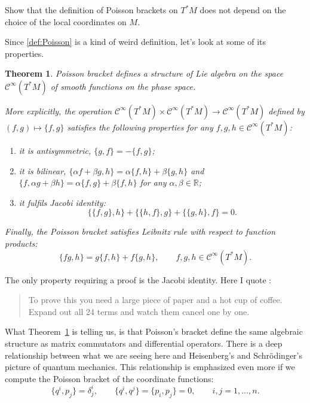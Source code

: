 \documentclass[english,fontsize=11pt,paper=a5,oneside]{scrbook}
\newcommand{\cC}{\mathcal{C}}
\newcommand{\R}{\mathbb{R}}
\newtheorem{theorem}{Theorem}[chapter]
\theoremstyle{definition}
\newenvironment{exercise}
  {\pushQED{\qed}\renewcommand{\qedsymbol}{$\maltese$}\exercisex}
  {\popQED\endexercisex}
\begin{document}
\begin{exercise}
    Show that the definition of Poisson brackets on $T^*M$ does not depend on the choice of the local coordinates on $M$.
\end{exercise}

Since \ref{def:Poisson} is a kind of weird definition, let’s look at some of its properties.

\begin{theorem}\label{thm:PoissonLieAlgebra}
    Poisson bracket defines a structure of Lie algebra on the space $\cC^\infty(T^*M)$ of smooth functions on the phase space.

    More explicitly, the operation $\cC^\infty(T^*M)\times \cC^\infty(T^*M) \to \cC^\infty(T^*M)$ defined by $(f,g) \mapsto \big\{f,g\big\}$ satisfies the following properties for any $f,g,h \in \cC^\infty(T^*M)$:
    \begin{enumerate}
        \item it is antisymmetric, $\big\{g,f\big\} = - \big\{f,g\big\}$;
        \item it is bilinear, $\big\{\alpha f + \beta g, h\big\} = \alpha\big\{f,h\big\} + \beta\big\{g,h\big\}$ and $\big\{f, \alpha g + \beta h\big\} = \alpha\big\{f,g\big\} + \beta\big\{f,h\big\}$ for any $\alpha, \beta \in\R$;
        \item it fulfils \emph{Jacobi identity}: 
        \begin{equation}\label{eq:JacobiId}
            \big\{\big\{f,g\big\},h\big\} + \big\{\big\{h,f\big\},g\big\} + \big\{\big\{g,h\big\},f\big\} = 0.
        \end{equation}
    \end{enumerate}
    Finally, the Poisson bracket satisfies \emph{Leibnitz rule} with respect to function products:
    \begin{equation}\label{eq:LeibnitzId}
        \big\{fg, h\big\} = g\big\{f, h\big\} + f \big\{g, h\big\}, \qquad f,g,h \in \cC^\infty(T^*M).
    \end{equation}
\end{theorem}

The only property requiring a proof is the Jacobi identity.
Here I quote \cite{lectures:tong}:
\begin{quote}
    To prove this you need a large piece of paper and a hot cup of coffee. Expand out all 24 terms and watch them cancel one by one.
\end{quote}

What Theorem~\ref{thm:PoissonLieAlgebra} is telling us, is that Poisson's bracket define the same algebraic structure as matrix commutators and differential operators.
There is a deep relationship between what we are seeing here and Heisenberg's and Schr\"odinger's picture of quantum mechanics.
This relationship is emphasized even more if we compute the Poisson bracket of the coordinate functions:
\begin{equation}\label{eq:coordcommutators}
    \big\{q^i,p_j\big\} = \delta^i_j, \qquad \big\{q^i,q^j\big\} = \big\{p_i,p_j\big\} = 0, \qquad i,j = 1,\ldots,n.
\end{equation}
\end{document}
